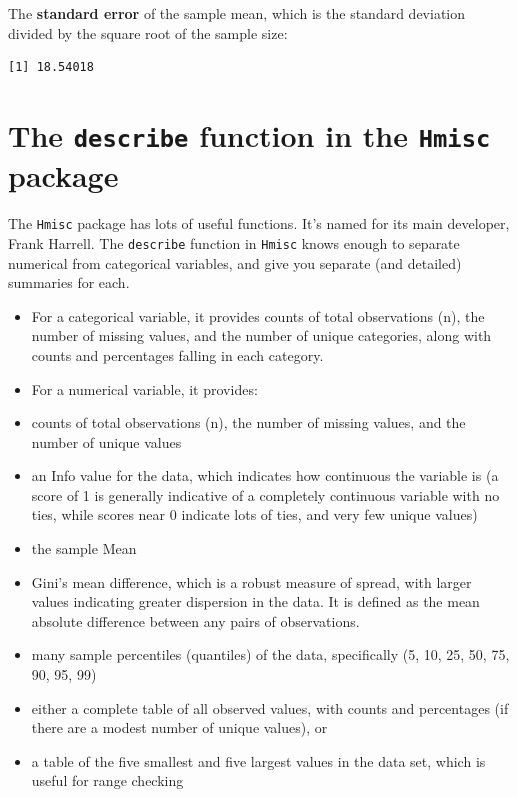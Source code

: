 \documentclass[
]{book}
\newenvironment{Shaded}{\begin{snugshade}}{\end{snugshade}}
\newcommand{\KeywordTok}[1]{\textcolor[rgb]{0.13,0.29,0.53}{\textbf{#1}}}
\newcommand{\NormalTok}[1]{#1}
\newcommand{\OperatorTok}[1]{\textcolor[rgb]{0.81,0.36,0.00}{\textbf{#1}}}
\providecommand{\tightlist}{%
  \setlength{\itemsep}{0pt}\setlength{\parskip}{0pt}}
\begin{document}
The \textbf{standard error} of the sample mean, which is the standard deviation divided by the square root of the sample size:

\begin{Shaded}
\end{Shaded}

\begin{verbatim}
[1] 18.54018
\end{verbatim}

\hypertarget{the-describe-function-in-the-hmisc-package}{%
\section{\texorpdfstring{The \texttt{describe} function in the \texttt{Hmisc} package}{The describe function in the Hmisc package}}\label{the-describe-function-in-the-hmisc-package}}

The \texttt{Hmisc} package has lots of useful functions. It's named for its main developer, Frank Harrell. The \texttt{describe} function in \texttt{Hmisc} knows enough to separate numerical from categorical variables, and give you separate (and detailed) summaries for each.

\begin{itemize}
\tightlist
\item
  For a categorical variable, it provides counts of total observations (n), the number of missing values, and the number of unique categories, along with counts and percentages falling in each category.
\item
  For a numerical variable, it provides:
\item
  counts of total observations (n), the number of missing values, and the number of unique values
\item
  an Info value for the data, which indicates how continuous the variable is (a score of 1 is generally indicative of a completely continuous variable with no ties, while scores near 0 indicate lots of ties, and very few unique values)
\item
  the sample Mean
\item
  Gini's mean difference, which is a robust measure of spread, with larger values indicating greater dispersion in the data. It is defined as the mean absolute difference between any pairs of observations.
\item
  many sample percentiles (quantiles) of the data, specifically (5, 10, 25, 50, 75, 90, 95, 99)
\item
  either a complete table of all observed values, with counts and percentages (if there are a modest number of unique values), or
\item
  a table of the five smallest and five largest values in the data set, which is useful for range checking
\end{itemize}
\end{document}
